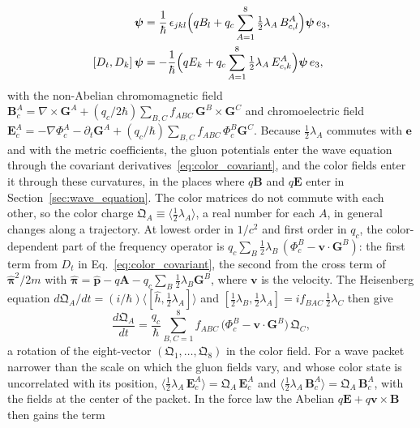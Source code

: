 \documentclass[aps,prd,onecolumn,tightenlines,nofootinbib,notitlepage,11pt,floatfix]{revtex4-2}
\theoremstyle{indentedtheorem}
\begin{document}
\begin{align}
    [D_j,D_k]\,\boldsymbol{\psi} &= \frac{1}{\hbar}\,\epsilon_{jkl}\Big(qB_l + q_c\sum_{A=1}^8\tfrac{1}{2}\lambda_A\,B_{c,l}^A\Big)\boldsymbol{\psi}\,e_3 , \notag\\
    [D_t,D_k]\,\boldsymbol{\psi} &= -\frac{1}{\hbar}\Big(qE_k + q_c\sum_{A=1}^8\tfrac{1}{2}\lambda_A\,E_{c,k}^A\Big)\boldsymbol{\psi}\,e_3 ,
    \label{eq:color_curvatures}
\end{align}
with the non-Abelian chromomagnetic field $\mathbf{B}_c^A = \nabla\times\mathbf{G}^A + (q_c/2\hbar)\sum_{B,C}f_{ABC}\,\mathbf{G}^B\times\mathbf{G}^C$ and chromoelectric field $\mathbf{E}_c^A = -\nabla\Phi_c^A - \partial_t\mathbf{G}^A + (q_c/\hbar)\sum_{B,C}f_{ABC}\,\Phi_c^B\mathbf{G}^C$. Because $\tfrac{1}{2}\lambda_A$ commutes with $\mathbf{e}$ and with the metric coefficients, the gluon potentials enter the wave equation through the covariant derivatives~\eqref{eq:color_covariant}, and the color fields enter it through these curvatures, in the places where $q\mathbf{B}$ and $q\mathbf{E}$ enter in Section~\ref{sec:wave_equation}. The color matrices do not commute with each other, so the color charge $\mathfrak{Q}_A \equiv \langle\tfrac{1}{2}\lambda_A\rangle$, a real number for each $A$, in general changes along a trajectory. At lowest order in $1/c^2$ and first order in $q_c$, the color-dependent part of the frequency operator is $q_c\sum_B\tfrac{1}{2}\lambda_B\,(\Phi_c^B - \mathbf{v}\cdot\mathbf{G}^B)$: the first term from $D_t$ in Eq.~\eqref{eq:color_covariant}, the second from the cross term of $\hat{\boldsymbol{\pi}}^2/2m$ with $\hat{\boldsymbol{\pi}} = \hat{\mathbf{p}} - q\mathbf{A} - q_c\sum_B\tfrac{1}{2}\lambda_B\mathbf{G}^B$, where $\mathbf{v}$ is the velocity. The Heisenberg equation $d\mathfrak{Q}_A/dt =(i/\hbar)\langle[\hat{h},\tfrac{1}{2}\lambda_A]\rangle$ and $[\tfrac{1}{2}\lambda_B,\tfrac{1}{2}\lambda_A] = i f_{BAC}\,\tfrac{1}{2}\lambda_C$ then give
\begin{equation}
    \frac{d\mathfrak{Q}_A}{dt} = \frac{q_c}{\hbar}\sum_{B,C=1}^8 f_{ABC}\,\big(\Phi_c^B - \mathbf{v}\cdot\mathbf{G}^B\big)\,\mathfrak{Q}_C ,
    \label{eq:wong_transport}
\end{equation}
a rotation of the eight-vector $(\mathfrak{Q}_1,\ldots,\mathfrak{Q}_8)$ in the color field. For a wave packet narrower than the scale on which the gluon fields vary, and whose color state is uncorrelated with its position, $\langle\tfrac{1}{2}\lambda_A\,\mathbf{E}_c^A\rangle = \mathfrak{Q}_A\,\mathbf{E}_c^A$ and $\langle\tfrac{1}{2}\lambda_A\,\mathbf{B}_c^A\rangle = \mathfrak{Q}_A\,\mathbf{B}_c^A$, with the fields at the center of the packet. In the force law the Abelian $q\mathbf{E}+q\mathbf{v}\times\mathbf{B}$ then gains the term
\end{document}
